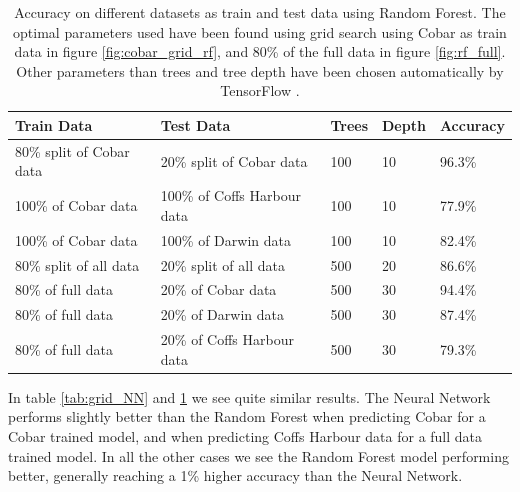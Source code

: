 \documentclass[11pt]{article}
\begin{document}
\begin{table}[H]
    \caption{Accuracy on different datasets as train and test data using Random Forest. The optimal parameters used have been found using grid search using Cobar as train data in figure \ref{fig:cobar_grid_rf}, and 80\% of the full data in figure \ref{fig:rf_full}. Other parameters than trees and tree depth have been chosen automatically by TensorFlow  \cite{tfrf}.}
    \label{tab:grid_RF}
    \centering
    \begin{tabular}{|l|l|l|l|l|}
        \hline
        \textbf{Train Data}      & \textbf{Test Data}          & \textbf{Trees} & \textbf{Depth} & \textbf{Accuracy} \\
        \hline
        80\% split of Cobar data & 20\% split of Cobar data    & 100            & 10             & 96.3\%            \\
        \hline
        100\% of Cobar data      & 100\% of Coffs Harbour data & 100            & 10             & 77.9\%            \\
        \hline
        100\% of Cobar data      & 100\% of Darwin data        & 100            & 10             & 82.4\%            \\
        \hline
        80\% split of all data   & 20\% split of all data      & 500            & 20             & 86.6\%            \\
        \hline
        80\% of full data        & 20\% of Cobar data          & 500            & 30             & 94.4\%            \\
        \hline
        80\% of full data        & 20\% of Darwin data         & 500            & 30             & 87.4\%            \\
        \hline
        80\% of full data        & 20\% of Coffs Harbour data  & 500            & 30             & 79.3\%            \\
        \hline
    \end{tabular}
\end{table}
In table \ref{tab:grid_NN} and \ref{tab:grid_RF} we see quite similar results. The Neural Network performs slightly better than the Random Forest when predicting Cobar for a Cobar trained model, and when predicting Coffs Harbour data for a full data trained model. In all the other cases we see the Random Forest model performing better, generally reaching a 1\% higher accuracy than the Neural Network.
\end{document}

